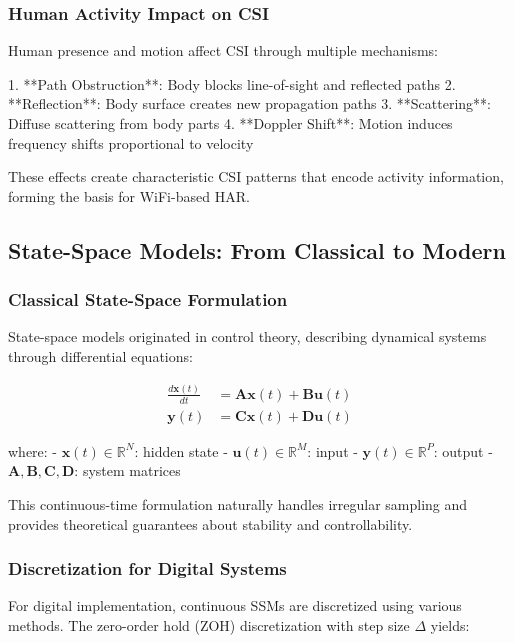 \documentclass[10pt,journal,compsoc]{IEEEtran}
\begin{document}
\subsubsection{Human Activity Impact on CSI}

Human presence and motion affect CSI through multiple mechanisms:

1. **Path Obstruction**: Body blocks line-of-sight and reflected paths
2. **Reflection**: Body surface creates new propagation paths  
3. **Scattering**: Diffuse scattering from body parts
4. **Doppler Shift**: Motion induces frequency shifts proportional to velocity

These effects create characteristic CSI patterns that encode activity information, forming the basis for WiFi-based HAR.

\subsection{State-Space Models: From Classical to Modern}

\subsubsection{Classical State-Space Formulation}

State-space models originated in control theory, describing dynamical systems through differential equations:

\begin{align}
\frac{d\mathbf{x}(t)}{dt} &= \mathbf{A}\mathbf{x}(t) + \mathbf{B}\mathbf{u}(t) \\
\mathbf{y}(t) &= \mathbf{C}\mathbf{x}(t) + \mathbf{D}\mathbf{u}(t)
\end{align}

where:
- $\mathbf{x}(t) \in \mathbb{R}^N$: hidden state
- $\mathbf{u}(t) \in \mathbb{R}^M$: input
- $\mathbf{y}(t) \in \mathbb{R}^P$: output
- $\mathbf{A}, \mathbf{B}, \mathbf{C}, \mathbf{D}$: system matrices

This continuous-time formulation naturally handles irregular sampling and provides theoretical guarantees about stability and controllability.

\subsubsection{Discretization for Digital Systems}

For digital implementation, continuous SSMs are discretized using various methods. The zero-order hold (ZOH) discretization with step size $\Delta$ yields:
\end{document}
